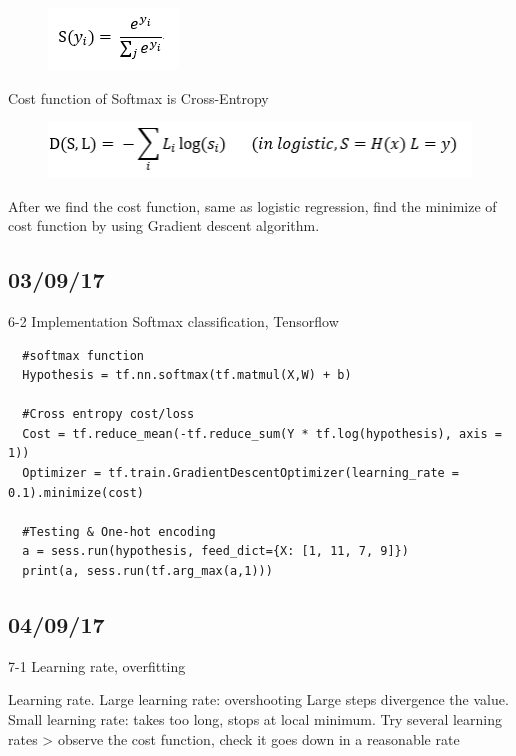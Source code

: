 \documentclass{article}
\begin{document}
\begin{CJK}{UTF8}{}
\begin{figure}[h!]
\centering
\includegraphics[scale=0.6]{8.jpg}
\end{figure}
Cost function of Softmax is Cross-Entropy \newline

\begin{figure}[h!]
\centering
\includegraphics[scale=0.6]{9.jpg}
\end{figure}
After we find the cost function, same as logistic regression, find the minimize of cost function by using Gradient descent algorithm.\newline

\subsection{03/09/17}
6-2 Implementation Softmax classification, Tensorflow\newline
\begin{verbatim}
  #softmax function
  Hypothesis = tf.nn.softmax(tf.matmul(X,W) + b)

  #Cross entropy cost/loss
  Cost = tf.reduce_mean(-tf.reduce_sum(Y * tf.log(hypothesis), axis = 1))
  Optimizer = tf.train.GradientDescentOptimizer(learning_rate = 0.1).minimize(cost)

  #Testing & One-hot encoding
  a = sess.run(hypothesis, feed_dict={X: [1, 11, 7, 9]})
  print(a, sess.run(tf.arg_max(a,1)))
\end{verbatim}\newline

\subsection{04/09/17}
7-1 Learning rate, overfitting\newline

Learning rate.	Large learning rate: overshooting\newline
Large steps divergence the value.	Small learning rate: takes too long, stops at local minimum.\newline
Try several learning rates > observe the cost function, check it goes down in a reasonable rate\newline


\end{CJK}
\end{document}
